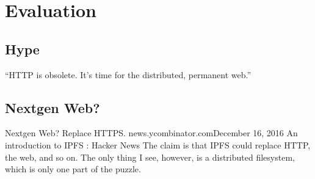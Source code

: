\section{Evaluation} \label{seEvaluation}

\subsection{Hype}

``HTTP is obsolete. It's time for the distributed, permanent web.''



\subsection{Nextgen Web?}

{ Nextgen Web? Replace HTTPS.  news.ycombinator.comDecember 16, 2016
  An introduction to IPFS : Hacker News The claim is that IPFS could
  replace HTTP, the web, and so on. The only thing I see, however, is
  a distributed filesystem, which is only one part of the puzzle.  }



